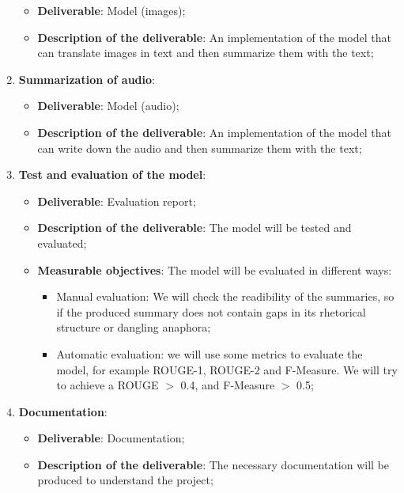 \documentclass[12pt]{article}
\begin{document}
\begin{enumerate}
    \begin{itemize}
        \item \textbf{Deliverable}: Model (images);
        \item \textbf{Description of the deliverable}: An implementation of the model that can translate images in text and 
        then summarize them with the text;
    \end{itemize}
    \item \textbf{Summarization of audio}:
    \begin{itemize}
        \item \textbf{Deliverable}: Model (audio);
        \item \textbf{Description of the deliverable}: An implementation of the model that can write down the audio and  
        then summarize them with the text;
    \end{itemize}
    \item \textbf{Test and evaluation of the model}:
    \begin{itemize}
        \item \textbf{Deliverable}: Evaluation report;
        \item \textbf{Description of the deliverable}: The model will be tested and evaluated;
        \item \textbf{Measurable objectives}: The model will be evaluated in different ways:
        \begin{itemize}
            \item Manual evaluation: We will check the readibility of the summaries, so if the produced summary does not contain gaps in its rhetorical structure or dangling anaphora;
            \item Automatic evaluation: we will use some metrics to evaluate the model, for example ROUGE-1, ROUGE-2 and F-Measure. We will try to achieve a ROUGE $>$ 0.4, and F-Measure $>$ 0.5;
        \end{itemize}
    \end{itemize}
    \item \textbf{Documentation}:
    \begin{itemize}
        \item \textbf{Deliverable}: Documentation;
        \item \textbf{Description of the deliverable}: The necessary documentation will be produced to understand the project;
    \end{itemize} 
\end{enumerate}
\end{document}
